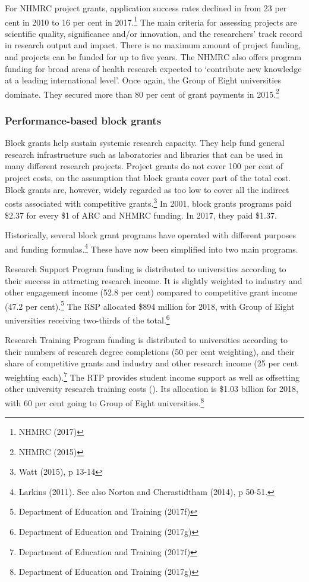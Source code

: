 \documentclass{grattan}
\begin{document}
For NHMRC project grants, application success rates declined in from 23 per cent in 2010 to 16 per cent in 2017.\footnote{NHMRC (2017)} The main criteria for assessing projects are scientific quality, significance and/or innovation, and the researchers' track record in research output and impact. There is no maximum amount of project funding, and projects can be funded for up to five years. The NHMRC also offers program funding for broad areas of health research expected to `contribute new knowledge at a leading international level'. Once again, the Group of Eight universities dominate. They secured more than 80 per cent of grant payments in 2015.\footnote{NHMRC (2015)}

%
\subsubsection{Performance-based block grants}\label{subsubsec:performance-based-block-grants}

Block grants help sustain systemic research capacity. They help fund general research infrastructure such as laboratories and libraries that can be used in many different research projects. Project grants do not cover 100 per cent of project costs, on the assumption that block grants cover part of the total cost. Block grants are, however, widely regarded as too low to cover all the indirect costs associated with competitive grants.\footnote{Watt (2015), p 13-14} In 2001, block grants programs paid \$2.37 for every \$1 of ARC and NHMRC funding. In 2017, they paid \$1.37.

Historically, several block grant programs have operated with different purposes and funding formulas.\footnote{Larkins (2011). See also Norton and Cherastidtham (2014), p 50-51.} These have now been simplified into two main programs.

Research Support Program funding is distributed to universities according to their success in attracting research income. It is slightly weighted to industry and other engagement income (52.8 per cent) compared to competitive grant income (47.2 per cent).\footnote{Department of Education and Training (2017f)} The RSP allocated \$894 million for 2018, with Group of Eight universities receiving two-thirds of the total.\footnote{Department of Education and Training (2017g)}

Research Training Program funding is distributed to universities according to their numbers of research degree completions (50 per cent weighting), and their share of competitive grants and industry and other research income (25 per cent weighting each).\footnote{Department of Education and Training (2017f)} The RTP provides student income support as well as offsetting other university research training costs (). Its allocation is \$1.03 billion for 2018, with 60 per cent going to Group of Eight universities.\footnote{Department of Education and Training (2017g)}
\end{document}
